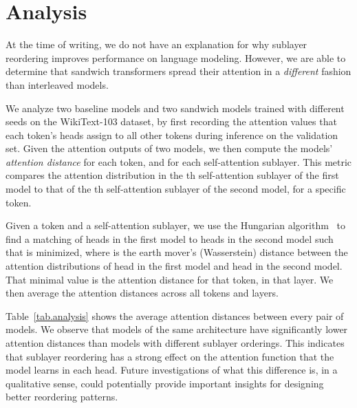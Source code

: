 \documentclass[11pt,a4paper]{article}
\begin{document}
 \section{Analysis}

At the time of writing, we do not have an explanation for why sublayer reordering improves performance on language modeling.
However, we are able to determine that sandwich transformers spread their attention in a \emph{different} fashion than interleaved models.


We analyze two baseline models and two sandwich models trained with different seeds on the WikiText-103 dataset, by first recording the attention values that each token's heads assign to all other tokens during inference on the validation set. 
Given the attention outputs of two models, we then compute the models' \emph{attention distance} for each token, and for each self-attention sublayer. This metric compares the attention distribution in the th self-attention sublayer of the first model to that of the th self-attention sublayer of the second model, for a specific token. 

Given a token and a self-attention sublayer, we use the Hungarian algorithm~\cite{kuhn1955hungarian} to find a matching of heads in the first model to heads in the second model  such that  is minimized, where  is the earth mover's (Wasserstein) distance between the attention distributions of head  in the first model and head  in the second model. That minimal value is the attention distance for that token, in that layer.
We then average the attention distances across all tokens and layers. 
 


Table~\ref{tab.analysis} shows the average attention distances between every pair of models. We observe that models of the same architecture have significantly lower attention distances than models with different sublayer orderings.
This indicates that sublayer reordering has a strong effect on the attention function that the model learns in each head.
Future investigations of what this difference is, in a qualitative sense, could potentially provide important insights for designing better reordering patterns.
\end{document}
